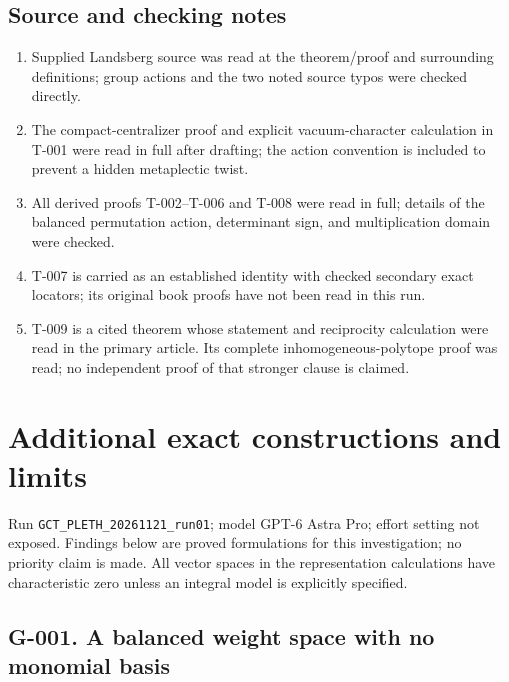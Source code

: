 \documentclass[
  10pt,
]{article}
\providecommand{\tightlist}{%
  \setlength{\itemsep}{0pt}\setlength{\parskip}{0pt}}
\providecommand{\tightlist}{\setlength{\itemsep}{0pt}\setlength{\parskip}{0pt}}
\begin{document}
\subsection{Source and checking notes}\label{source-and-checking-notes}

\begin{enumerate}
\def\labelenumi{\arabic{enumi}.}
\tightlist
\item
  Supplied Landsberg source was read at the theorem/proof and
  surrounding definitions; group actions and the two noted source typos
  were checked directly.
\item
  The compact-centralizer proof and explicit vacuum-character
  calculation in T-001 were read in full after drafting; the action
  convention is included to prevent a hidden metaplectic twist.
\item
  All derived proofs T-002--T-006 and T-008 were read in full; details
  of the balanced permutation action, determinant sign, and
  multiplication domain were checked.
\item
  T-007 is carried as an established identity with checked secondary
  exact locators; its original book proofs have not been read in this
  run.
\item
  T-009 is a cited theorem whose statement and reciprocity calculation
  were read in the primary article. Its complete inhomogeneous-polytope
  proof was read; no independent proof of that stronger clause is
  claimed.
\end{enumerate}

\section{Additional exact constructions and
limits}\label{additional-exact-constructions-and-limits}

Run
\texttt{\small GCT\_\allowbreak{}PLETH\_\allowbreak{}20261121\_\allowbreak{}run01};
model GPT-6 Astra Pro; effort setting not exposed. Findings below are
proved formulations for this investigation; no priority claim is made.
All vector spaces in the representation calculations have characteristic
zero unless an integral model is explicitly specified.

\subsection{G-001. A balanced weight space with no monomial
basis}\label{g-001.-a-balanced-weight-space-with-no-monomial-basis}
\end{document}
